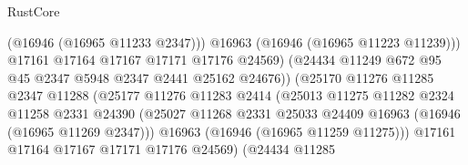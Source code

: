 \begin{lexlean}{RustCore}
\begin{coremodule}
                                            (@16946 (@16965 @11233 @2347)))
                                          @16963
                                          (@16946 (@16965 @11223 @11239)))
                                        @17161
                                        @17164
                                        @17167
                                        @17171
                                        @17176
                                        @24569)
                                      (@24434
                                        @11249
                                        @672
                                        @95
                                        @45
                                        @2347
                                        @5948
                                        @2347
                                        @2441
                                        @25162
                                        @24676))
                                    (@25170
                                      @11276
                                      @11285
                                      @2347
                                      @11288
                                      (@25177
                                        @11276
                                        @11283
                                        @2414
                                        (@25013
                                          @11275
                                          @11282
                                          @2324
                                          @11258
                                          @2331
                                          @24390
                                          (@25027
                                            @11268
                                            @2331
                                            @25033
                                            @24409
                                            @16963
                                            (@16946 (@16965 @11269 @2347)))
                                          @16963
                                          (@16946 (@16965 @11259 @11275)))
                                        @17161
                                        @17164
                                        @17167
                                        @17171
                                        @17176
                                        @24569)
                                      (@24434
                                        @11285

\end{coremodule}
\end{lexlean}
